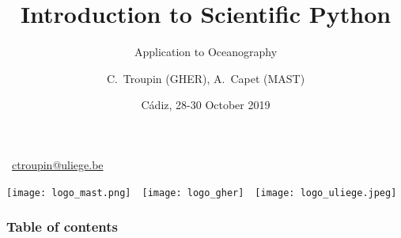 
\parindent 0cm

\title[Scientific Python]{Introduction to Scientific Python}
\subtitle{Application to Oceanography}
\date[]{Cádiz, 28-30 October 2019}
\author{C.~Troupin (GHER), A.~Capet (MAST)}



\begin{frame}
\centering

\footnotesize
\maketitle
\faEnvelopeO~\href{mailto:ctroupin@uliege.be}{ctroupin@uliege.be} 
\vfill


\texttt{[image: logo\_mast.png]}~~\texttt{[image: logo\_gher]}~~\texttt{[image: logo\_uliege.jpeg]}


\end{frame}



\begin{frame}
\frametitle{Table of contents}
\end{frame}







  


